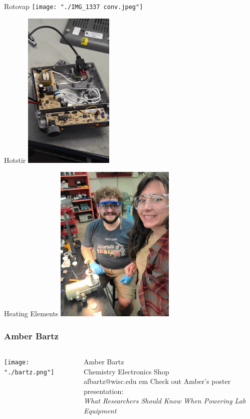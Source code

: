 \documentclass{presentation}
\begin{document}
\begin{frame}{Rotovap}
  \centering
  \texttt{[image: "./IMG\_1337 conv.jpeg"]}
\end{frame}

\begin{frame}{Hotstir}
  \centering
  \includegraphics[height=3in]{"./hotstir.jpg"}
\end{frame}

\begin{frame}{Heating Elements}
  \centering
  \includegraphics[height=3in]{"./434231758_821246973358309_3914670158938270453_n.jpg"}
\end{frame}

\begin{frame}\frametitle{Amber Bartz}
  \begin{columns}
    \begin{column}{0.33\textwidth}
      \texttt{[image: "./bartz.png"]}
    \end{column}
    \begin{column}{0.67\textwidth}
      Amber Bartz \\
      Chemistry Electronics Shop \\
      afbartz@wisc.edu
       em
      Check out Amber's poster presentation: \\
      \emph{What Researchers Should Know When Powering Lab Equipment}
    \end{column}
  \end{columns}
\end{frame}
\end{document}
